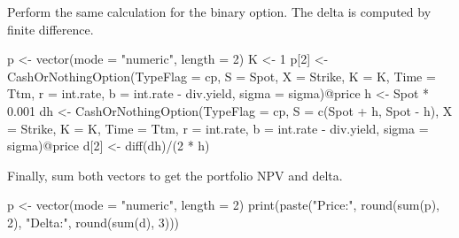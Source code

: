 \documentclass[justified]{tufte-book}
\newenvironment{Shaded}{}{}
\newcommand{\AttributeTok}[1]{\textcolor[rgb]{0.49,0.56,0.16}{#1}}
\newcommand{\DecValTok}[1]{\textcolor[rgb]{0.25,0.63,0.44}{#1}}
\newcommand{\FloatTok}[1]{\textcolor[rgb]{0.25,0.63,0.44}{#1}}
\newcommand{\FunctionTok}[1]{\textcolor[rgb]{0.02,0.16,0.49}{#1}}
\newcommand{\NormalTok}[1]{#1}
\newcommand{\OtherTok}[1]{\textcolor[rgb]{0.00,0.44,0.13}{#1}}
\newcommand{\SpecialCharTok}[1]{\textcolor[rgb]{0.25,0.44,0.63}{#1}}
\newcommand{\StringTok}[1]{\textcolor[rgb]{0.25,0.44,0.63}{#1}}
\begin{document}
Perform the same calculation for the binary option. The delta is computed
by finite difference.

\begin{Shaded}
\begin{Highlighting}[]
\NormalTok{p }\OtherTok{\textless{}{-}} \FunctionTok{vector}\NormalTok{(}\AttributeTok{mode =} \StringTok{"numeric"}\NormalTok{, }\AttributeTok{length =} \DecValTok{2}\NormalTok{)}
\NormalTok{K }\OtherTok{\textless{}{-}} \DecValTok{1}
\NormalTok{p[}\DecValTok{2}\NormalTok{] }\OtherTok{\textless{}{-}} \FunctionTok{CashOrNothingOption}\NormalTok{(}\AttributeTok{TypeFlag =}\NormalTok{ cp, }\AttributeTok{S =}\NormalTok{ Spot,}
    \AttributeTok{X =}\NormalTok{ Strike, }\AttributeTok{K =}\NormalTok{ K, }\AttributeTok{Time =}\NormalTok{ Ttm, }\AttributeTok{r =}\NormalTok{ int.rate, }\AttributeTok{b =}\NormalTok{ int.rate }\SpecialCharTok{{-}}
\NormalTok{        div.yield, }\AttributeTok{sigma =}\NormalTok{ sigma)}\SpecialCharTok{@}\NormalTok{price}
\NormalTok{h }\OtherTok{\textless{}{-}}\NormalTok{ Spot }\SpecialCharTok{*} \FloatTok{0.001}
\NormalTok{dh }\OtherTok{\textless{}{-}} \FunctionTok{CashOrNothingOption}\NormalTok{(}\AttributeTok{TypeFlag =}\NormalTok{ cp, }\AttributeTok{S =} \FunctionTok{c}\NormalTok{(Spot }\SpecialCharTok{+}
\NormalTok{    h, Spot }\SpecialCharTok{{-}}\NormalTok{ h), }\AttributeTok{X =}\NormalTok{ Strike, }\AttributeTok{K =}\NormalTok{ K, }\AttributeTok{Time =}\NormalTok{ Ttm, }\AttributeTok{r =}\NormalTok{ int.rate,}
    \AttributeTok{b =}\NormalTok{ int.rate }\SpecialCharTok{{-}}\NormalTok{ div.yield, }\AttributeTok{sigma =}\NormalTok{ sigma)}\SpecialCharTok{@}\NormalTok{price}
\NormalTok{d[}\DecValTok{2}\NormalTok{] }\OtherTok{\textless{}{-}} \FunctionTok{diff}\NormalTok{(dh)}\SpecialCharTok{/}\NormalTok{(}\DecValTok{2} \SpecialCharTok{*}\NormalTok{ h)}
\end{Highlighting}
\end{Shaded}

Finally, sum both vectors to get the portfolio NPV and delta.

\begin{Shaded}
\begin{Highlighting}[]
\NormalTok{p }\OtherTok{\textless{}{-}} \FunctionTok{vector}\NormalTok{(}\AttributeTok{mode =} \StringTok{"numeric"}\NormalTok{, }\AttributeTok{length =} \DecValTok{2}\NormalTok{)}
\FunctionTok{print}\NormalTok{(}\FunctionTok{paste}\NormalTok{(}\StringTok{"Price:"}\NormalTok{, }\FunctionTok{round}\NormalTok{(}\FunctionTok{sum}\NormalTok{(p), }\DecValTok{2}\NormalTok{), }\StringTok{"Delta:"}\NormalTok{, }\FunctionTok{round}\NormalTok{(}\FunctionTok{sum}\NormalTok{(d),}
    \DecValTok{3}\NormalTok{)))}
\end{Highlighting}
\end{Shaded}
\end{document}
